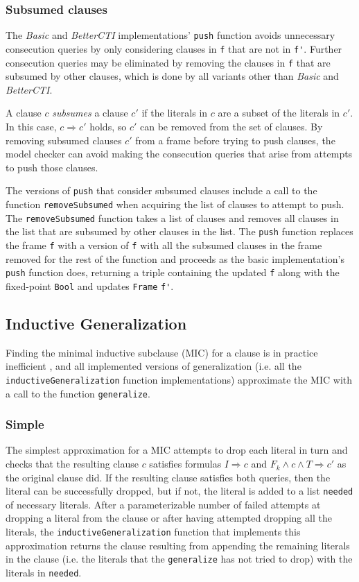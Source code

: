 \documentclass[12pt,a4paper,twoside,openright]{report}
\begin{document}
{\subsubsection{Subsumed clauses}
The \emph{Basic} and \emph{BetterCTI} implementations' \verb,push, function avoids unnecessary
consecution queries by only considering clauses in \verb,f, that are not in \verb,f',.
Further consecution queries may be eliminated by removing the clauses in \verb,f,
that are subsumed by other clauses, which is done by all variants other than {\it Basic}
and \emph{BetterCTI}.

A clause $c$ \emph{subsumes} a clause $c'$ if the literals in $c$ are a subset of the literals
in $c'$. In this case, $c \Rightarrow c'$ holds, so $c'$ can be removed from the set of clauses. By
removing subsumed clauses $c'$ from a frame before trying to push clauses, the model
checker can avoid making the consecution queries that arise from attempts to push those clauses.

The versions of \verb,push, that consider subsumed clauses include a call to the function
\verb,removeSubsumed, when acquiring the list of clauses to attempt to push.
The \verb,removeSubsumed, function takes a list of clauses and removes all clauses in the list
that are subsumed by other clauses in the list. The \verb,push, function replaces the frame
\verb,f, with a version of \verb,f, with all the subsumed clauses in the frame removed for
the rest of the function and proceeds as the basic implementation's \verb,push, function does,
returning a triple containing the updated \verb,f, along with the fixed-point \verb,Bool,
and updates \verb,Frame, \verb,f',.

\subsection{Inductive Generalization}
Finding the minimal inductive subclause (MIC) for a clause is in practice inefficient
\cite{griggio14},
and all implemented versions of generalization
(i.e. all the \verb,inductiveGeneralization, function implementations) approximate the MIC with a call to the function
\verb,generalize,.

\subsubsection{Simple}
The simplest approximation for a MIC attempts to drop each literal in turn and checks
that the resulting clause $c$ satisfies formulas $I \Rightarrow c$ and
$F_k \wedge c \wedge T \Rightarrow c'$ as the original clause did. If the resulting clause
satisfies both queries, then the literal can be successfully dropped,
but if not, the literal is added to a list \verb,needed, of necessary literals.
After a parameterizable number of failed attempts at dropping a literal from the clause or after
having attempted dropping all the literals, the
\verb,inductiveGeneralization, function that implements this approximation
returns the clause resulting from appending the remaining
literals in the clause (i.e. the literals that the \verb,generalize, has not tried to drop)
with the literals in \verb,needed,.

}
\end{document}
